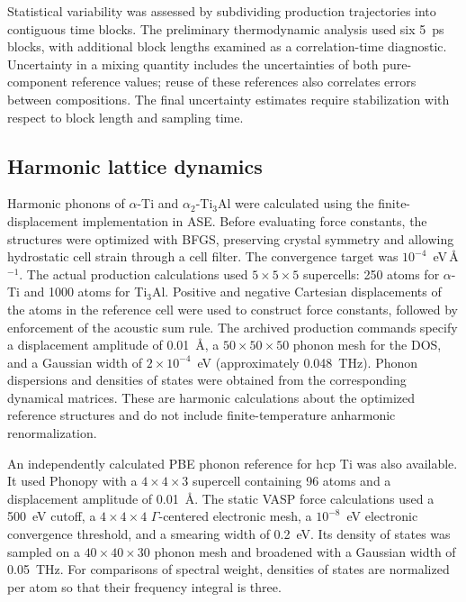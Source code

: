 Statistical variability was assessed by subdividing production trajectories into contiguous time blocks.
The preliminary thermodynamic analysis used six 5~ps blocks, with additional block lengths examined as a correlation-time diagnostic.
Uncertainty in a mixing quantity includes the uncertainties of both pure-component reference values; reuse of these references also correlates errors between compositions.
The final uncertainty estimates require stabilization with respect to block length and sampling time.

\subsection{Harmonic lattice dynamics}
\label{sec:phonons}

Harmonic phonons of $\alpha$-Ti and $\alpha_2$-Ti$_3$Al were calculated using the finite-displacement implementation in ASE.
Before evaluating force constants, the structures were optimized with BFGS, preserving crystal symmetry and allowing hydrostatic cell strain through a cell filter.
The convergence target was $10^{-4}$~eV\,\AA$^{-1}$.
The actual production calculations used $5\times5\times5$ supercells: 250 atoms for $\alpha$-Ti and 1000 atoms for Ti$_3$Al.
Positive and negative Cartesian displacements of the atoms in the reference cell were used to construct force constants, followed by enforcement of the acoustic sum rule.
The archived production commands specify a displacement amplitude of 0.01~\AA{}, a $50\times50\times50$ phonon mesh for the DOS, and a Gaussian width of $2\times10^{-4}$~eV (approximately 0.048~THz).
Phonon dispersions and densities of states were obtained from the corresponding dynamical matrices.
These are harmonic calculations about the optimized reference structures and do not include finite-temperature anharmonic renormalization.

An independently calculated PBE phonon reference for hcp Ti was also available.
It used Phonopy\cite{Togo2015} with a $4\times4\times3$ supercell containing 96 atoms and a displacement amplitude of 0.01~\AA.
The static VASP force calculations used a 500~eV cutoff, a $4\times4\times4$ $\Gamma$-centered electronic mesh, a $10^{-8}$~eV electronic convergence threshold, and a smearing width of 0.2~eV.
Its density of states was sampled on a $40\times40\times30$ phonon mesh and broadened with a Gaussian width of 0.05~THz.
For comparisons of spectral weight, densities of states are normalized per atom so that their frequency integral is three.

